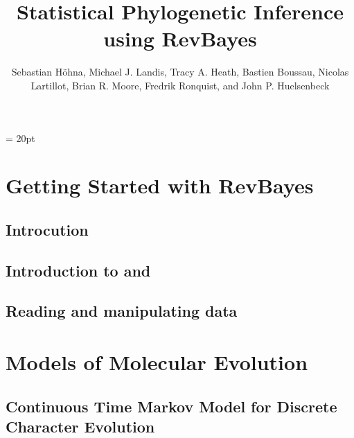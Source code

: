 \documentclass[11pt]{book}
\begin{document}
\renewcommand{\headrulewidth}{0.5pt}
\headsep = 20pt
\lhead{ }


\frontmatter

\title{\Huge \textbf{Statistical Phylogenetic Inference using RevBayes} }
\author{
Sebastian H{\"o}hna,
Michael J. Landis,
Tracy A. Heath,
Bastien Boussau,
Nicolas Lartillot,
Brian R. Moore,
Fredrik Ronquist, and
John P. Huelsenbeck
}


\maketitle

\tableofcontents




\mainmatter

\def \GlobalResourcePath {./}

\part{Getting Started with RevBayes}

\chapter{Introcution}
\def \ResourcePath {RB_Getting_Started/}


\chapter{Introduction to \RevBayes and \Rev}
\def \ResourcePath {RB_Basics_Tutorial/}


\chapter{Reading and manipulating data}
\def \ResourcePath {RB_Data_Tutorial/}




\part{Models of Molecular Evolution}

\chapter{Continuous Time Markov Model for Discrete Character Evolution}
\def \ResourcePath {RB_CTMC_Tutorial/}

\end{document}
